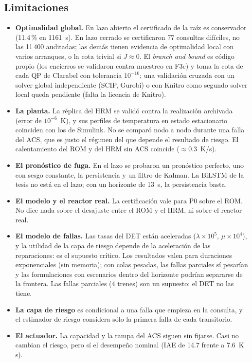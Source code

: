 \subsection{Limitaciones}
\begin{itemize}
  \item \textbf{Optimalidad global.} En lazo abierto el certificado de la raíz es conservador
        (11.4\,\% en 1161~s). En lazo cerrado se certificaron 77 consultas difíciles, no las
        11\,400 auditadas; las demás tienen evidencia de optimalidad local con varios arranques,
        o la cota trivial si $J\approx0$. El \emph{branch and bound} es código propio (los
        encierros se validaron contra muestreo en F3c) y toma la cota de cada QP de Clarabel con
        tolerancia $10^{-10}$; una validación cruzada con un solver global independiente (SCIP,
        Gurobi) o con Knitro como segundo solver local queda pendiente (falta la licencia de
        Knitro).
  \item \textbf{La planta.} La réplica del HRM se validó contra la realización archivada (error
        de $10^{-6}$~K), y sus perfiles de temperatura en estado estacionario coinciden con los
        de Simulink. No se comparó nodo a nodo durante una falla del ACS, que es justo el
        régimen del que depende el resultado de riesgo. El calentamiento del ROM y del HRM sin
        ACS coincide ($\approx0.3$~K/s).
  \item \textbf{El pronóstico de fuga.} En el lazo se probaron un pronóstico perfecto, uno con
        sesgo constante, la persistencia y un filtro de Kalman. La BiLSTM de la tesis no está en
        el lazo; con un horizonte de 13~s, la persistencia basta.
  \item \textbf{El modelo y el reactor real.} La certificación vale para P0 sobre el ROM. No dice
        nada sobre el desajuste entre el ROM y el HRM, ni sobre el reactor real.
  \item \textbf{El modelo de fallas.} Las tasas del DET están aceleradas ($\lambda\times10^5$,
        $\mu\times10^4$), y la utilidad de la capa de riesgo depende de la aceleración de las
        reparaciones: es el supuesto crítico. Los resultados valen para duraciones
        exponenciales (sin memoria); con colas pesadas, las fallas parciales sí pesarían y las
        formulaciones con escenarios dentro del horizonte podrían separarse de la frontera. Las
        fallas parciales (4 trenes) son un supuesto: el DET no las tiene.
  \item \textbf{La capa de riesgo} es condicional a una falla que empieza en la consulta, y el
        estimador de riesgo considera sólo la primera falla de cada transitorio.
  \item \textbf{El actuador.} La capacidad y la rampa del ACS siguen sin fijarse. Casi no
        cambian el riesgo, pero sí el desempeño nominal (IAE de 14.7 frente a 7.6~K\,s).
\end{itemize}

